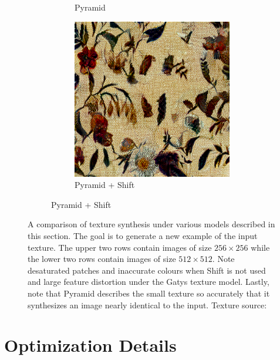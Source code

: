 \begin{figure}[ht]
\begin{subfigure}{0.8\textwidth}
\begin{subfigure}{0.32\textwidth}
            \caption{Pyramid}
            \label{fig:methods_comparison_large-pyramid}
        \end{subfigure}
        \hfill
        \begin{subfigure}{0.32\textwidth}
            \centering
            \includegraphics[width=\textwidth]{images/03-comparison_large_pyramid_shift.jpg}
            \caption{Pyramid + Shift}
            \label{fig:methods_comparison_large-pyramid_shift}
        \end{subfigure}
    \end{subfigure}
    \caption{A comparison of texture synthesis under various models described in this section. The goal is to generate a new example of the input texture. The upper two rows contain images of size \(256 \times 256\) while the lower two rows contain images of size \(512 \times 512\). Note desaturated patches and inaccurate colours when Shift is not used and large feature distortion under the Gatys texture model. Lastly, note that Pyramid describes the small texture so accurately that it synthesizes an image nearly identical to the input. Texture source: \citet{Pixar128}}
    \label{fig:methods_comparison_small}
\end{figure}

\section{Optimization Details}
\label{section:methods-optimization}

